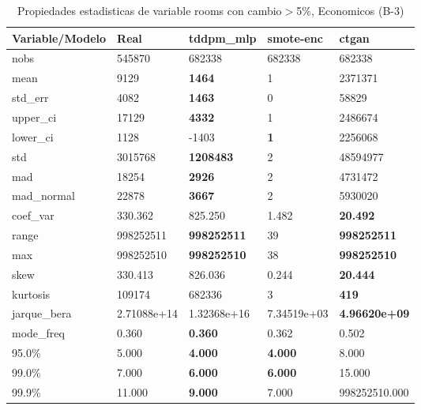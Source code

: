 \begin{table}[H]
\centering
\fontsize{8}{14}\selectfont
\caption{Propiedades estadisticas de variable rooms con cambio\ensuremath{>}5\%, Economicos (B-3)}
\label{table-stats-economicos-b-3-rooms-short}
\begin{tabular}{|l|m{10em}|m{10em}|m{10em}|m{10em}|}
\hline
 \rowcolor[gray]{0.8}
Variable/Modelo & Real & tddpm\_mlp & smote-enc & ctgan \\
\hline nobs & 545870 & 682338 & 682338 & 682338 \\
\hline mean & 9129 & \bfseries 1464 & 1 & \cellcolor[rgb]{0.9, 0.54, 0.52} 2371371 \\
\hline std\_err & 4082 & \bfseries 1463 & 0 & \cellcolor[rgb]{0.9, 0.54, 0.52} 58829 \\
\hline upper\_ci & 17129 & \bfseries 4332 & 1 & \cellcolor[rgb]{0.9, 0.54, 0.52} 2486674 \\
\hline lower\_ci & 1128 & -1403 & \bfseries 1 & \cellcolor[rgb]{0.9, 0.54, 0.52} 2256068 \\
\hline std & 3015768 & \bfseries 1208483 & 2 & \cellcolor[rgb]{0.9, 0.54, 0.52} 48594977 \\
\hline mad & 18254 & \bfseries 2926 & 2 & \cellcolor[rgb]{0.9, 0.54, 0.52} 4731472 \\
\hline mad\_normal & 22878 & \bfseries 3667 & 2 & \cellcolor[rgb]{0.9, 0.54, 0.52} 5930020 \\
\hline coef\_var & 330.362 & \cellcolor[rgb]{0.9, 0.54, 0.52} 825.250 & 1.482 & \bfseries 20.492 \\
\hline range & 998252511 & \bfseries 998252511 & \cellcolor[rgb]{0.9, 0.54, 0.52} 39 & \bfseries 998252511 \\
\hline max & 998252510 & \bfseries 998252510 & \cellcolor[rgb]{0.9, 0.54, 0.52} 38 & \bfseries 998252510 \\
\hline skew & 330.413 & \cellcolor[rgb]{0.9, 0.54, 0.52} 826.036 & 0.244 & \bfseries 20.444 \\
\hline kurtosis & 109174 & \cellcolor[rgb]{0.9, 0.54, 0.52} 682336 & 3 & \bfseries 419 \\
\hline jarque\_bera & 2.71088e+14 & \cellcolor[rgb]{0.9, 0.54, 0.52} 1.32368e+16 & 7.34519e+03 & \bfseries 4.96620e+09 \\
\hline mode\_freq & 0.360 & \bfseries 0.360 & 0.362 & \cellcolor[rgb]{0.9, 0.54, 0.52} 0.502 \\
\hline 95.0\% & 5.000 & \bfseries 4.000 & \bfseries 4.000 & \cellcolor[rgb]{0.9, 0.54, 0.52} 8.000 \\
\hline 99.0\% & 7.000 & \bfseries 6.000 & \bfseries 6.000 & \cellcolor[rgb]{0.9, 0.54, 0.52} 15.000 \\
\hline 99.9\% & 11.000 & \bfseries 9.000 & 7.000 & \cellcolor[rgb]{0.9, 0.54, 0.52} 998252510.000 \\
\hline
\end{tabular}
\end{table}
